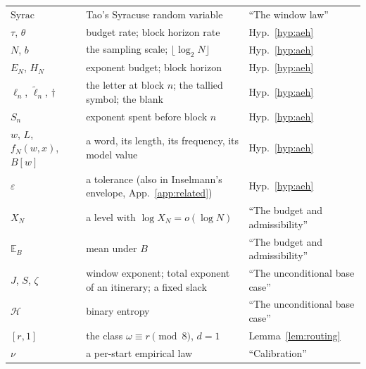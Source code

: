 \documentclass[11pt]{article}
\theoremstyle{remark}
\newcommand{\w}{\omega}
\newcommand{\Ent}{\mathcal{H}}
\begin{document}
{\begin{longtable}{>{\raggedright\arraybackslash}p{}>{\raggedright\arraybackslash}p{}>{\raggedright\arraybackslash}p{}}
$\mathrm{Syrac}$ & Tao's Syracuse random variable & ``The window law'' \\
$\tau$, $\theta$ & budget rate; block horizon rate & Hyp.~\ref{hyp:aeh} \\
$N$, $b$ & the sampling scale; $\lfloor \log_2 N\rfloor$ & Hyp.~\ref{hyp:aeh} \\
$E_N$, $H_N$ & exponent budget; block horizon & Hyp.~\ref{hyp:aeh} \\
$\ell_n$, $\tilde\ell_n$, $\dagger$ & the letter at block $n$; the tallied symbol; the blank & Hyp.~\ref{hyp:aeh} \\
$S_n$ & exponent spent before block $n$ & Hyp.~\ref{hyp:aeh} \\
$w$, $L$, $f_N(w,x)$, $B[w]$ & a word, its length, its frequency, its model value & Hyp.~\ref{hyp:aeh} \\
$\varepsilon$ & a tolerance (also in Inselmann's envelope, App.~\ref{app:related}) & Hyp.~\ref{hyp:aeh} \\
$X_N$ & a level with $\log X_N = o(\log N)$ & ``The budget and admissibility'' \\
$\mathbb{E}_B$ & mean under $B$ & ``The budget and admissibility'' \\
$J$, $S$, $\zeta$ & window exponent; total exponent of an itinerary; a fixed slack & ``The unconditional base case'' \\
$\Ent$ & binary entropy & ``The unconditional base case'' \\
$[r,1]$ & the class $\w \equiv r \pmod 8$, $d = 1$ & Lemma~\ref{lem:routing} \\
$\nu$ & a per-start empirical law & ``Calibration'' \\
\hline
\end{longtable}
}
\end{document}
